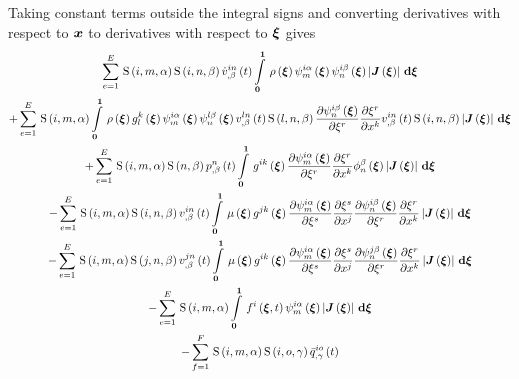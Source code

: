 Taking constant terms outside the integral signs and converting derivatives
with respect to $\boldsymbol{x}$ to derivatives with respect to $\boldsymbol{\xi}$ gives
\begin{multline}
  \gsum{e=1}{E}{\idxgsf{i}{m}{\alpha}\idxgsf{i}{n}{\beta}\fnof{\idxnodedof{\dot{v}}{i}{n}{\beta}}{t}
    \gint{\vectr{0}}{\vectr{1}}{\fnof{\rho}{\vectr{\xi}}
      \idxgbfn{i}{m}{\alpha}{\vectr{\xi}}\idxgbfn{i}{n}{\beta}{\vectr{\xi}}
      \abs{\fnof{\matr{J}}{\vectr{\xi}}}}{\vectr{\xi}}}\\
  +\gsum{e=1}{E}{\idxgsf{i}{m}{\alpha}\gint{\vectr{0}}{\vectr{1}}{\fnof{\rho}{\vectr{\xi}}
      \fnof{g^{k}_{l}}{\vectr{\xi}}\idxgbfn{i}{m}{\alpha}{\vectr{\xi}}\idxgbfn{l}{n}{\beta}{\vectr{\xi}}
      \fnof{\idxnodedof{v}{l}{n}{\beta}}{t}\idxgsf{l}{n}{\beta}\delby{\idxgbfn{i}{n}{\beta}{\vectr{\xi}}}{\xi^{r}}
      \delby{\xi^{r}}{x^{k}}\fnof{\idxnodedof{v}{i}{n}{\beta}}{t}\idxgsf{i}{n}{\beta}
      \abs{\fnof{\matr{J}}{\vectr{\xi}}}}{\vectr{\xi}}}\\
  +\gsum{e=1}{E}{\idxgsf{i}{m}{\alpha}\gsf{n}{\beta}\fnof{\nodedof{p}{n}{\beta}}{t}\gint{\vectr{0}}{\vectr{1}}{
      \fnof{g^{ik}}{\vectr{\xi}}\delby{\idxgbfn{i}{m}{\alpha}{\vectr{\xi}}}{\xi^{r}}\delby{\xi^{r}}{x^{k}}
      \altgbfn{n}{\beta}{\vectr{\xi}}\abs{\fnof{\matr{J}}{\vectr{\xi}}}}{\vectr{\xi}}}\\
  -\gsum{e=1}{E}{\idxgsf{i}{m}{\alpha}\idxgsf{i}{n}{\beta}\fnof{\idxnodedof{v}{i}{n}{\beta}}{t}\gint{\vectr{0}}{\vectr{1}}{
      \fnof{\mu}{\vectr{\xi}}\fnof{g^{jk}}{\vectr{\xi}}\delby{\idxgbfn{i}{m}{\alpha}{\vectr{\xi}}}{\xi^{s}}
      \delby{\xi^{s}}{x^{j}}\delby{\idxgbfn{i}{n}{\beta}{\vectr{\xi}}}{\xi^{r}}\delby{\xi^{r}}{x^{k}}
      \abs{\fnof{\matr{J}}{\vectr{\xi}}}}{\vectr{\xi}}}\\
  -\gsum{e=1}{E}{\idxgsf{i}{m}{\alpha}\idxgsf{j}{n}{\beta}\fnof{\idxnodedof{v}{j}{n}{\beta}}{t}
    \gint{\vectr{0}}{\vectr{1}}{\fnof{\mu}{\vectr{\xi}}\fnof{g^{ik}}{\vectr{\xi}}\delby{\idxgbfn{i}{m}{\alpha}{\vectr{\xi}}}{\xi^{s}}
      \delby{\xi^{s}}{x^{j}}\delby{\idxgbfn{j}{n}{\beta}{\vectr{\xi}}}{\xi^{r}}\delby{\xi^{r}}{x^{k}}
      \abs{\fnof{\matr{J}}{\vectr{\xi}}}}{\vectr{\xi}}} \\
  -\gsum{e=1}{E}{\idxgsf{i}{m}{\alpha}\gint{\vectr{0}}{\vectr{1}}{\fnof{f^{i}}{\vectr{\xi},t}\idxgbfn{i}{m}{\alpha}{\vectr{\xi}}\abs{\fnof{\matr{J}}{\vectr{\xi}}}}{\vectr{\xi}}}\\
  -\gsum{f=1}{F}{\idxgsf{i}{m}{\alpha}\idxgsf{i}{o}{\gamma}\fnof{\idxnodedof{\bar{q}}{i}{o}{\gamma}}{t}
}
\end{multline}
